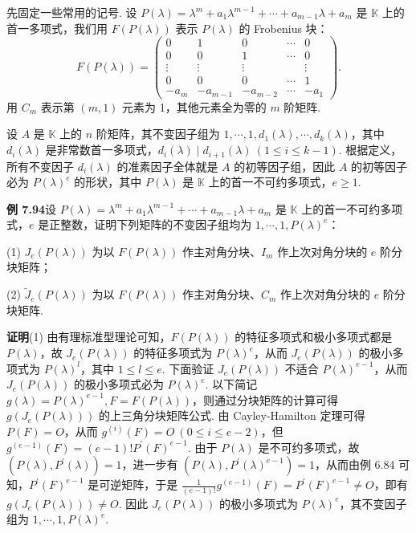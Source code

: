 \documentclass[UTF8, 12pt, fontset=fandol, oneside]{ctexart}
\begin{document}
先固定一些常用的记号. 设 $P(\lambda)=\lambda^m+a_1\lambda^{m-1}+\cdots+a_{m-1}\lambda+a_m$ 是 $\mathbb{K}$ 上的首一多项式，我们用 $F(P(\lambda))$ 表示 $P(\lambda)$ 的 Frobenius 块：
\[
F(P(\lambda))=\left(\begin{array}{ccccc}
0&1&0&\cdots&0\\
0&0&1&\cdots&0\\
\vdots&\vdots&\vdots&&\vdots\\
0&0&0&\cdots&1\\
-a_m&-a_{m-1}&-a_{m-2}&\cdots&-a_1
\end{array}\right).
\]
用 $C_m$ 表示第 $(m,1)$ 元素为 1，其他元素全为零的 $m$ 阶矩阵.

设 $A$ 是 $\mathbb{K}$ 上的 $n$ 阶矩阵，其不变因子组为 $1,\cdots,1,d_1(\lambda),\cdots,d_k(\lambda)$，其中 $d_i(\lambda)$ 是非常数首一多项式，$d_i(\lambda)\mid d_{i+1}(\lambda)\ (1\le i\le k-1)$. 根据定义，所有不变因子 $d_i(\lambda)$ 的准素因子全体就是 $A$ 的初等因子组，因此 $A$ 的初等因子必为 $P(\lambda)^e$ 的形状，其中 $P(\lambda)$ 是 $\mathbb{K}$ 上的首一不可约多项式，$e\ge1$.

\noindent\textbf{例 7.94}\quad 设 $P(\lambda)=\lambda^m+a_1\lambda^{m-1}+\cdots+a_{m-1}\lambda+a_m$ 是 $\mathbb{K}$ 上的首一不可约多项式，$e$ 是正整数，证明下列矩阵的不变因子组均为 $1,\cdots,1,P(\lambda)^e$：

(1) $J_e(P(\lambda))$ 为以 $F(P(\lambda))$ 作主对角分块、$I_m$ 作上次对角分块的 $e$ 阶分块矩阵；

(2) $\widetilde J_e(P(\lambda))$ 为以 $F(P(\lambda))$ 作主对角分块、$C_m$ 作上次对角分块的 $e$ 阶分块矩阵.

\noindent\textbf{证明}\quad (1) 由有理标准型理论可知，$F(P(\lambda))$ 的特征多项式和极小多项式都是 $P(\lambda)$，故 $J_e(P(\lambda))$ 的特征多项式为 $P(\lambda)^e$，从而 $J_e(P(\lambda))$ 的极小多项式为 $P(\lambda)^l$，其中 $1\le l\le e$. 下面验证 $J_e(P(\lambda))$ 不适合 $P(\lambda)^{e-1}$，从而 $J_e(P(\lambda))$ 的极小多项式必为 $P(\lambda)^e$. 以下简记 $g(\lambda)=P(\lambda)^{e-1},F=F(P(\lambda))$，则通过分块矩阵的计算可得 $g(J_e(P(\lambda)))$ 的上三角分块矩阵公式. 由 Cayley-Hamilton 定理可得 $P(F)=O$，从而 $g^{(i)}(F)=O\ (0\le i\le e-2)$，但 $g^{(e-1)}(F)=(e-1)!P^{\prime}(F)^{e-1}$. 由于 $P(\lambda)$ 是不可约多项式，故 $(P(\lambda),P^{\prime}(\lambda))=1$，进一步有 $(P(\lambda),P^{\prime}(\lambda)^{e-1})=1$，从而由例 6.84 可知，$P^{\prime}(F)^{e-1}$ 是可逆矩阵，于是 $\frac1{(e-1)!}g^{(e-1)}(F)=P^{\prime}(F)^{e-1}\ne O$，即有 $g(J_e(P(\lambda)))\ne O$. 因此 $J_e(P(\lambda))$ 的极小多项式为 $P(\lambda)^e$，其不变因子组为 $1,\cdots,1,P(\lambda)^e$.
\end{document}
